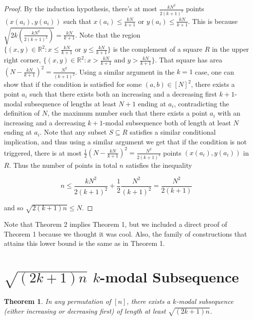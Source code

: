 \documentclass{article}
\newtheorem{theorem}{Theorem}
\begin{document}
\begin{proof}
By the induction hypothesis, there's at most $\frac{kN^2}{2(k+1)^2}$ points $(x(a_i), y(a_i))$ such that $x(a_i) \leq \frac{kN}{k+1}$ or $y(a_i) \leq \frac{kN}{k+1}$. This is because $\sqrt{2k (\frac{kN^2}{2(k+1)^2})} = \frac{kN}{k+1}$. Note that the region $\{(x,y) \in \mathbb{R}^2 : x \leq \frac{kN}{k+1} \text{ or } y \leq \frac{kN}{k+1}\}$ is the complement of a square $R$ in the upper right corner, $\{(x,y) \in \mathbb{R}^2 : x > \frac{kN}{k+1} \text{ and } y > \frac{kN}{k+1}\}$. That square has area $(N - \frac{kN}{k+1})^2 = \frac{N^2}{(k+1)^2}$. Using a similar argument in the $k=1$ case, one can show that if the condition is satisfied for some $(a,b) \in [N]^2$, there exists a point $a_i$ such that there exists both an increasing and a decreasing first $k+1$-modal subsequence of lengths at least $N+1$ ending at $a_i$, contradicting the definition of $N$, the maximum number such that there exists a point $a_i$ with an increasing and a decreasing $k+1$-modal subsequence both of length at least $N$ ending at $a_i$. Note that any subset $S \subseteq R$ satisfies a similar conditional implication, and thus using a similar argument we get that if the condition is not triggered, there is at most $\frac{1}{2}(N - \frac{kN}{k+1})^2 = \frac{N^2}{2(k+1)^2}$ points $(x(a_i), y(a_i))$ in $R$. Thus the number of points in total $n$ satisfies the inequality

$$n \leq \frac{kN^2}{2(k+1)^2} + \frac{1}{2}\frac{N^2}{(k+1)^2} = \frac{N^2}{2(k+1)}$$

and so $\sqrt{2(k+1)n} \leq N$. 
\end{proof} 

Note that Theorem 2 implies Theorem 1, but we included a direct proof of Theorem 1 because we thought it was cool. Also, the family of constructions that attains this lower bound is the same as in Theorem 1. \\

\section{$\sqrt{(2k+1)n}$ $k$-modal Subsequence}

\begin{theorem}
In any permutation of $[n]$, there exists a $k$-modal subsequence (either increasing or decreasing first) of length at least $\sqrt{(2k+1)n}$. 
\end{theorem}
\end{document}
